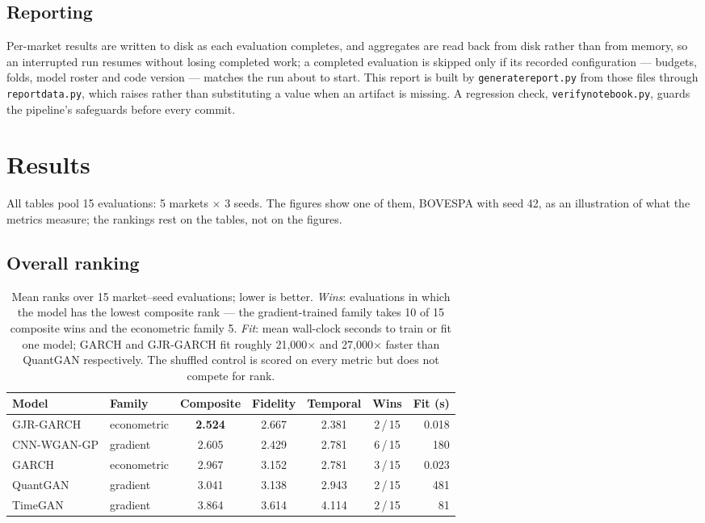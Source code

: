 \documentclass[11pt,a4paper]{article}
\makeatletter
\DeclareRobustCommand{\_}{\ifmmode\nfss@text{\textunderscore}\else\textunderscore\allowbreak\fi}
\makeatother
\begin{document}
\subsection{Reporting}
Per-market results are written to disk as each evaluation completes, and aggregates are read back from disk rather than from memory, so an interrupted run resumes without losing completed work; a completed evaluation is skipped only if its recorded configuration --- budgets, folds, model roster and code version --- matches the run about to start. This report is built by \texttt{generate\_report.py} from those files through \texttt{report\_data.py}, which raises rather than substituting a value when an artifact is missing. A regression check, \texttt{verify\_notebook.py}, guards the pipeline's safeguards before every commit.
\section{Results}
\label{sec:results}
All tables pool 15 evaluations: 5 markets $\times$ 3 seeds. The figures show one of them, BOVESPA with seed 42, as an illustration of what the metrics measure; the rankings rest on the tables, not on the figures.

\subsection{Overall ranking}
\label{sec:ranking}

\begin{table}[htbp]
\centering
\caption{Mean ranks over 15 market--seed evaluations; lower is better. \emph{Wins}: evaluations in which the model has the lowest composite rank --- the gradient-trained family takes 10 of 15 composite wins and the econometric family 5. \emph{Fit}: mean wall-clock seconds to train or fit one model; GARCH and GJR-GARCH fit roughly 21,000$\times$ and 27,000$\times$ faster than QuantGAN respectively. The shuffled control is scored on every metric but does not compete for rank.}
\label{tab:ranking}
\begin{tabular}{@{}llccccr@{}}
\toprule
Model & Family & Composite & Fidelity & Temporal & Wins & Fit (s) \\
\midrule
GJR-GARCH & econometric & \textbf{2.524} & 2.667 & 2.381 & 2\,/\,15 & 0.018 \\
CNN-WGAN-GP & gradient & 2.605 & 2.429 & 2.781 & 6\,/\,15 & 180 \\
GARCH & econometric & 2.967 & 3.152 & 2.781 & 3\,/\,15 & 0.023 \\
QuantGAN & gradient & 3.041 & 3.138 & 2.943 & 2\,/\,15 & 481 \\
TimeGAN & gradient & 3.864 & 3.614 & 4.114 & 2\,/\,15 & 81 \\
\bottomrule
\end{tabular}
\end{table}
\end{document}
